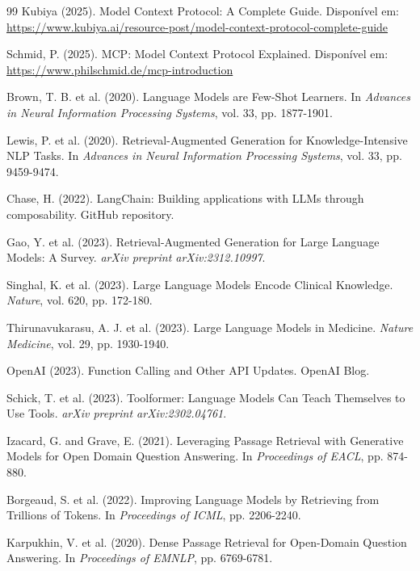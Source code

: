 \documentclass[12pt]{article}
\begin{document}
\begin{thebibliography}{99}
Kubiya (2025). Model Context Protocol: A Complete Guide. Disponível em: \url{https://www.kubiya.ai/resource-post/model-context-protocol-complete-guide}

Schmid, P. (2025). MCP: Model Context Protocol Explained. Disponível em: \url{https://www.philschmid.de/mcp-introduction}

Brown, T. B. et al. (2020). Language Models are Few-Shot Learners. In \textit{Advances in Neural Information Processing Systems}, vol. 33, pp. 1877-1901.

Lewis, P. et al. (2020). Retrieval-Augmented Generation for Knowledge-Intensive NLP Tasks. In \textit{Advances in Neural Information Processing Systems}, vol. 33, pp. 9459-9474.

Chase, H. (2022). LangChain: Building applications with LLMs through composability. GitHub repository.

Gao, Y. et al. (2023). Retrieval-Augmented Generation for Large Language Models: A Survey. \textit{arXiv preprint arXiv:2312.10997}.

Singhal, K. et al. (2023). Large Language Models Encode Clinical Knowledge. \textit{Nature}, vol. 620, pp. 172-180.

Thirunavukarasu, A. J. et al. (2023). Large Language Models in Medicine. \textit{Nature Medicine}, vol. 29, pp. 1930-1940.

OpenAI (2023). Function Calling and Other API Updates. OpenAI Blog.

Schick, T. et al. (2023). Toolformer: Language Models Can Teach Themselves to Use Tools. \textit{arXiv preprint arXiv:2302.04761}.

Izacard, G. and Grave, E. (2021). Leveraging Passage Retrieval with Generative Models for Open Domain Question Answering. In \textit{Proceedings of EACL}, pp. 874-880.

Borgeaud, S. et al. (2022). Improving Language Models by Retrieving from Trillions of Tokens. In \textit{Proceedings of ICML}, pp. 2206-2240.

Karpukhin, V. et al. (2020). Dense Passage Retrieval for Open-Domain Question Answering. In \textit{Proceedings of EMNLP}, pp. 6769-6781.


\end{thebibliography}
\end{document}
